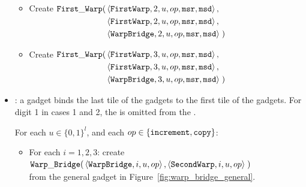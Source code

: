 \begin{itemize}
\begin{itemize}
                \item Create
                $\begin{aligned}[t]
                    \firstwarp(& \left\langle {\tt FirstWarp},  2, u, \inc, {\tt msr}, {\tt msd} \right\rangle, \\ %
                               & \left\langle {\tt FirstWarp},  2, u, \inc, {\tt msr}, {\tt msd} \right\rangle, \\ %
                               & \left\langle {\tt WarpBridge}, 2, u, \inc, {\tt msr}, {\tt msd} \right\rangle \;) %
                \end{aligned}$
                \vspace{.5cm}

                \item Create
                $\begin{aligned}[t]
                    \firstwarp(& \left\langle {\tt FirstWarp},  3, u, \inc, {\tt msr}, {\tt msd} \right\rangle,\\  %
                               & \left\langle {\tt FirstWarp},  3, u, \inc, {\tt msr}, {\tt msd} \right\rangle,\\  %
                               & \left\langle {\tt WarpBridge}, 3, u, \inc, {\tt msr}, {\tt msd} \right\rangle \;) %
                \end{aligned}$
                \vspace{.5cm}

            \end{itemize}
        \vspace{.5cm}

        \item {\warpbridge}: a {\warpbridge} gadget binds the last tile of the {\firstwarp} gadgets to the
             first tile of the {\secondwarp} gadgets. For digit 1 in cases 1 and 2, the
             {\warpbridge} is omitted from the {\warpunit}.

        For each $u \in \{0, 1\}^l$, and each $op \in \{ {\tt increment, copy } \}$:
        \begin{itemize}

            \item For each $i = 1,2,3$: create \\
            $\begin{aligned}[t]
                {\tt Warp\_Bridge}(& \left\langle {\tt WarpBridge}, i, u, op \right\rangle,
                              \left\langle {\tt SecondWarp}, i, u, op \right\rangle \;)
            \end{aligned}$ \\ from the general gadget in Figure~\ref{fig:warp_bridge_general}.
            \vspace{.5cm}


\end{itemize}
\end{itemize}
